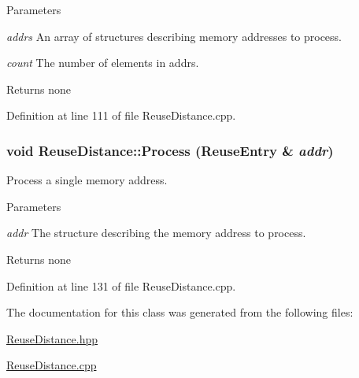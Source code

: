 \begin{DoxyParams}{Parameters}
\item[{\em addrs}]An array of structures describing memory addresses to process. \item[{\em count}]The number of elements in addrs.\end{DoxyParams}
\begin{DoxyReturn}{Returns}
none 
\end{DoxyReturn}


Definition at line 111 of file ReuseDistance.cpp.

\hypertarget{class_reuse_distance_a4ff6b77022ce62e0fdefa5cc297b932a}{
\subsubsection[{Process}]{\setlength{\rightskip}{0pt plus 5cm}void ReuseDistance::Process ({\bf ReuseEntry} \& {\em addr})}}
\label{class_reuse_distance_a4ff6b77022ce62e0fdefa5cc297b932a}
Process a single memory address.


\begin{DoxyParams}{Parameters}
\item[{\em addr}]The structure describing the memory address to process.\end{DoxyParams}
\begin{DoxyReturn}{Returns}
none 
\end{DoxyReturn}


Definition at line 131 of file ReuseDistance.cpp.



The documentation for this class was generated from the following files:\begin{DoxyCompactItemize}
\item 
\hyperlink{_reuse_distance_8hpp}{ReuseDistance.hpp}\item 
\hyperlink{_reuse_distance_8cpp}{ReuseDistance.cpp}\end{DoxyCompactItemize}
